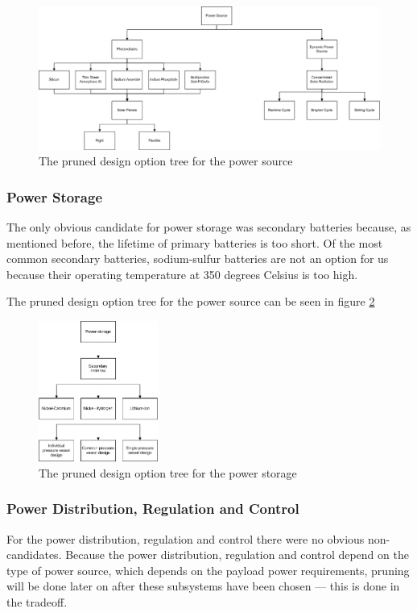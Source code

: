 \begin{figure}
\centering
\includegraphics[width=\textheight, angle=90]{chapters/img/DOTeps_sourcePruned.png}
\caption{The pruned design option tree for the power source}
\label{fig:DOTeps_sourcePruned}
\end{figure}

\subsubsection{Power Storage}
\label{pruneEPS:Storage}
The only obvious candidate for power storage was secondary batteries because, as mentioned before, the lifetime of primary batteries is too short.
Of the most common secondary batteries, sodium-sulfur batteries are not an option for us because their operating temperature at 350 degrees Celsius is too high.

The pruned design option tree for the power source can be seen in figure \ref{fig:DOTeps_storagePruned}

\begin{figure}
\centering
\includegraphics[width=0.35\textwidth]{chapters/img/DOTeps_storagePruned.png}
\caption{The pruned design option tree for the power storage}
\label{fig:DOTeps_storagePruned}
\end{figure}

\subsubsection{Power Distribution, Regulation and Control}
\label{pruneEPS:Distribution}
For the power distribution, regulation and control there were no obvious non-candidates. Because the power distribution, regulation and control depend on the type of power source, which depends on the payload power requirements, pruning will be done later on after these subsystems have been chosen --- this is done in the tradeoff.

